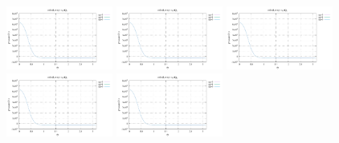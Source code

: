 \noindent
\includegraphics[width=3.5cm]{python_codes/fieldstone_152/RESULTS/exp3/qqq_16_m2}
\includegraphics[width=3.5cm]{python_codes/fieldstone_152/RESULTS/exp3/qqq_16_m3}
\includegraphics[width=3.5cm]{python_codes/fieldstone_152/RESULTS/exp3/qqq_16_m4}
\includegraphics[width=3.5cm]{python_codes/fieldstone_152/RESULTS/exp3/qqq_16_m5}
\includegraphics[width=3.5cm]{python_codes/fieldstone_152/RESULTS/exp3/qqq_16_m6}


